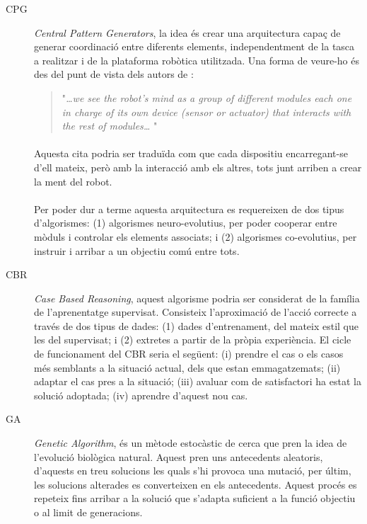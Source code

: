 \documentclass[12pt,a4paper,final,twoside]{article}
\begin{document}
\begin{description}

\item[CPG] \textit{Central Pattern Generators}, la idea és crear una arquitectura capaç de generar coordinació entre diferents elements, independentment de la tasca a realitzar i de la plataforma robòtica utilitzada. Una forma de veure-ho és des del punt de vista dels autors de \cite{Tellez2005a}:
\begin{quotation}
"\textit{\dots we see the robot’s mind as a group of different modules each one in charge of its own device (sensor or actuator) that interacts with the rest of modules\dots} "
\end{quotation}

\paragraph{}Aquesta cita podria ser traduïda com que cada dispositiu encarregant-se d'ell mateix, però amb la interacció amb els altres, tots junt arriben a crear la ment del robot.

\paragraph{}Per poder dur a terme aquesta arquitectura es requereixen de dos tipus d'algorismes: (1) algorismes neuro-evolutius, per poder cooperar entre mòduls i controlar els elements associats; i (2) algorismes co-evolutius, per instruir i arribar a un objectiu comú entre tots.


\item[CBR] \textit{Case Based Reasoning}, aquest algorisme podria ser considerat de la família de l'aprenentatge supervisat. Consisteix l'aproximació de l'acció correcte a través de dos tipus de dades: (1) dades d'entrenament, del mateix estil que les del supervisat; i (2) extretes a partir de la pròpia experiència. El cicle de funcionament del CBR seria el següent: (i) prendre el cas o els casos més semblants a la situació actual, dels que estan emmagatzemats; (ii) adaptar el cas pres a la situació; (iii) avaluar com de satisfactori ha estat la solució adoptada; (iv) aprendre d'aquest nou cas.

\item[GA] \textit{Genetic Algorithm}, és un mètode estocàstic de cerca que pren la idea de l'evolució biològica natural. Aquest pren uns antecedents aleatoris, d'aquests en treu solucions les quals s'hi provoca una mutació, per últim, les solucions alterades es converteixen en els antecedents. Aquest procés es repeteix fins arribar a la solució que s'adapta suficient a la funció objectiu o al limit de generacions.

\end{description}
\end{document}
